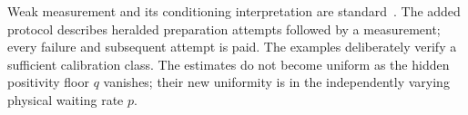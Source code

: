 Weak measurement and its conditioning interpretation are standard~\cite{Jacobs}. The added protocol describes heralded preparation attempts followed by a measurement; every failure and subsequent attempt is paid. The examples deliberately verify a sufficient calibration class. The estimates do not become uniform as the hidden positivity floor $q$ vanishes; their new uniformity is in the independently varying physical waiting rate $p$.
